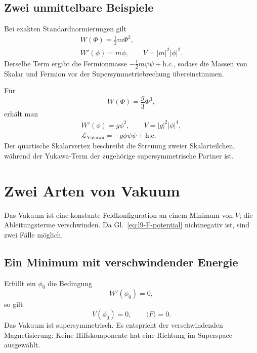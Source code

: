 \subsection{Zwei unmittelbare Beispiele}

Bei exakten Standardnormierungen gilt
\begin{equation}
\begin{gathered}
W(\Phi)=\frac12m\Phi^2,\\
W'(\phi)=m\phi,
\qquad V=|m|^2|\phi|^2.
\end{gathered}
\label{eq:l9-quadratic-W}
\end{equation}
Derselbe Term ergibt die Fermionmasse
\(-\tfrac12m\psi\psi+\mathrm{h.c.}\), sodass die Massen von Skalar und Fermion vor der Supersymmetriebrechung übereinstimmen.

Für
\begin{equation}
W(\Phi)=\frac{g}{3}\Phi^3,
\end{equation}
erhält man
\begin{equation}
\begin{gathered}
W'(\phi)=g\phi^2,
\qquad V=|g|^2|\phi|^4,\\
\mathcal L_{\mathrm{Yukawa}}
=-g\phi\psi\psi+\mathrm{h.c.}
\end{gathered}
\label{eq:l9-cubic-W}
\end{equation}
Der quartische Skalarvertex beschreibt die Streuung zweier Skalarteilchen, während der Yukawa-Term der zugehörige supersymmetrische Partner ist.

\section{Zwei Arten von Vakuum}

Das Vakuum ist eine konstante Feldkonfiguration an einem Minimum von \(V\); die Ableitungsterme verschwinden. Da Gl.~\eqref{eq:l9-F-potential} nichtnegativ ist, sind zwei Fälle möglich.

\subsection{Ein Minimum mit verschwindender Energie}

Erfüllt ein \(\phi_0\) die Bedingung
\begin{equation}
W'(\phi_0)=0,
\end{equation}
so gilt
\begin{equation}
V(\phi_0)=0,
\qquad
\langle F\rangle=0.
\label{eq:l9-unbroken-F}
\end{equation}
Das Vakuum ist supersymmetrisch. Es entspricht der verschwindenden Magnetisierung: Keine Hilfskomponente hat eine Richtung im Superspace ausgewählt.

